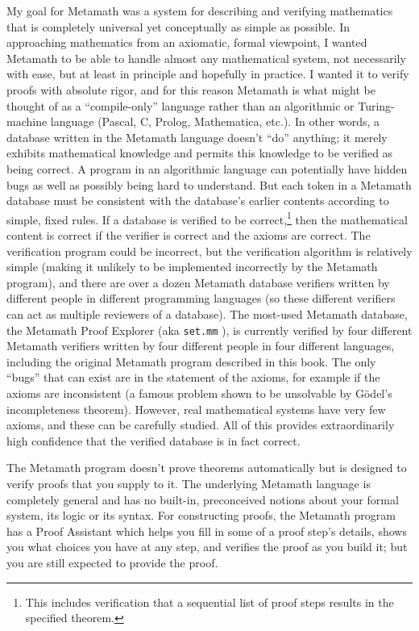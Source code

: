 My goal
for Metamath was a system for describing and verifying
mathematics that is completely universal yet conceptually as simple as
possible.  In approaching mathematics from an axiomatic, formal viewpoint, I
wanted Metamath to be able to handle almost any mathematical system, not
necessarily with ease, but at least in principle and hopefully in practice. I
wanted it to verify proofs with absolute rigor, and for this reason Metamath
is what might be thought of as a ``compile-only'' language rather than an
algorithmic or Turing-machine language (Pascal, C, Prolog, Mathematica,
etc.).  In other words, a database written in the Metamath
language doesn't ``do'' anything; it merely exhibits mathematical knowledge
and permits this knowledge to be verified as being correct.  A program in an
algorithmic language can potentially have hidden bugs as well as possibly being hard to understand.  But each token in a
Metamath database must be consistent with the database's earlier
contents according to simple, fixed rules.
If a database is verified
to be correct,\footnote{This includes
verification that a sequential list of proof steps results in the specified
theorem.} then the mathematical content is correct if the
verifier is correct and the axioms are correct.
The verification program could be incorrect, but the verification algorithm
is relatively simple (making it unlikely to be implemented incorrectly
by the Metamath program),
and there are over a dozen Metamath database verifiers
written by different people in different programming languages
(so these different verifiers can act as multiple reviewers of a database).
The most-used Metamath database, the Metamath Proof Explorer
(aka \texttt{set.mm}%
),
is currently verified by four different Metamath verifiers written by
four different people in four different languages, including the
original Metamath program described in this book.
The only ``bugs'' that can exist are in the statement of the axioms,
for example if the axioms are inconsistent (a famous problem shown to be
unsolvable by G\"{o}del's incompleteness theorem).
However, real mathematical systems have very few axioms, and these can
be carefully studied.
All of this provides extraordinarily high confidence that the verified database
is in fact correct.

The Metamath program
doesn't prove theorems automatically but is designed to verify proofs
that you supply to it.
The underlying Metamath language is completely general and has no built-in,
preconceived notions about your formal system, its logic
or its syntax.
For constructing proofs, the Metamath program has a Proof Assistant which helps you fill in some of a proof step's details, shows you
what choices you have at any step, and verifies the proof as you build it; but
you are still expected to provide the proof.


